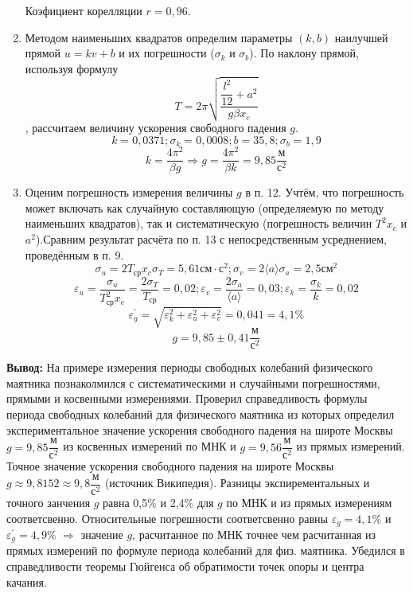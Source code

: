 \documentclass[a4paper, 12pt]{article}
\begin{document}
\begin{enumerate}
Коэфициент корелляции $r = 0,96$.
\item Методом наименьших квадратов определим параметры $(k,b)$ наилучшей прямой $u = kv + b$ и их погрешности ($\sigma_k$ и $\sigma_b$). По наклону прямой, используя формулу 
\[T = 2\pi\sqrt{\dfrac{\dfrac{l^2}{12} + a^2}{g\beta x_c}}\]
, рассчитаем величину ускорения свободного падения $g$.
\[ k = 0,0371 ; \sigma_k = 0,0008; b = 35,8 ; \sigma_b = 1,9\] 
\[ k = \dfrac{4\pi^2}{\beta g} \Rightarrow g = \dfrac{4\pi^2}{\beta k} = 9,85 \dfrac{\text{м}}{\text{с}^2}\]
\item Оценим погрешность измерения величины $g$ в п. 12. Учтём, что погрешность может включать как случайную составляющую (определяемую по методу наименьших квадратов), так и систематическую (погрешность величин $T^2x_c$ и $a^2$).Сравним результат расчёта по п. 13 с
непосредственным усреднением, проведённым в п. 9.
\[\sigma_u = 2T_{\text{ср}}x_c\sigma_T = 5,61\text{см} \cdot \text{с}^2; \sigma_v = 2\langle a\rangle\sigma_a = 2,5 \text{см}^2\]
\[\varepsilon_u = \dfrac{\sigma_u}{T_{\text{ср}}^2x_c} = \dfrac{2\sigma_T}{T_{\text{ср}}} = 0,02; \varepsilon_v = \dfrac{2\sigma_a}{\langle a\rangle} = 0,03; \varepsilon_k = \dfrac{\sigma_k}{k} = 0,02\]
\[\varepsilon_g^{'} = \sqrt{\varepsilon_k^2 + \varepsilon_u^2 + \varepsilon_v^2} = 0,041 = 4,1\%\]
\[ g = 9,85 \pm 0,41 \dfrac{\text{м}}{\text{с}^2}\]
\end{enumerate}
\textbf{\large Вывод:}
На примере измерения периоды свободных колебаний физического маятника познаколмился с систематическими и случайными погрешностями, прямыми и косвенными измерениями. Проверил справедливость формулы периода свободных колебаний для физического маятника из которых определил экспериментальное значение ускорения свободного падения на широте Москвы $g = 9,85 \dfrac{\text{м}}{\text{с}^2}$ из косвенных измерений по МНК и $g = 9,56 \dfrac{\text{м}}{\text{с}^2}$ из прямых измерений. Точное значение ускорения свободного падения на широте Москвы $g \approx 9,8152 \approx 9,8 \dfrac{\text{м}}{\text{с}^2}$ (источник Википедия). Разницы экспирементальных и точного занчения $g$ равна 0,5\% и 2,4\% для $g$ по МНК и из прямых измерениям соответсвенно. Относительные погрешности соответсвенно равны $\varepsilon_g = 4,1\%$ и $\varepsilon_g^{'} = 4,9\%$ $\Rightarrow$ значение $g$, расчитанное по МНК точнее чем расчитанная из прямых измерений по формуле периода колебаний для физ. маятника. 
Убедился в справедливости теоремы Гюйгенса об обратимости точек опоры и центра качания.  
\end{document}

